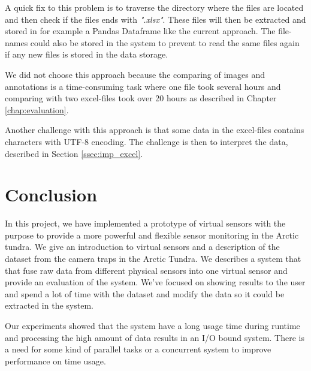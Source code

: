\documentclass[USenglish]{uit-thesis}
\begin{document}
A quick fix to this problem is to traverse the directory where the files are located and then check if the files ends with \textit{".xlsx"}. These files will then be extracted and stored in for example a Pandas Dataframe like the current approach. The file-names could also be stored in the system to prevent to read the same files again if any new files is stored in the data storage.

We did not choose this approach because the comparing of images and annotations is a time-consuming task where one file took several hours and comparing with two excel-files took over 20 hours as described in Chapter \ref{chap:evaluation}. %

Another challenge with this approach is that some data in the excel-files contains characters with UTF-8 encoding. The challenge is then to interpret the data, described in Section \ref{ssec:imp_excel}.





\chapter{Conclusion}
In this project, we have implemented a prototype of virtual sensors with the purpose to provide a more powerful and flexible sensor monitoring in the Arctic tundra. We give an introduction to virtual sensors and a description of the dataset from the camera traps in the Arctic Tundra. We describes a system that that fuse raw data from different physical sensors into one virtual sensor and provide an evaluation of the system.
We've focused on showing results to the user and spend a lot of time with the dataset and modify the data so it could be extracted in the system.

Our experiments showed that the system have a long usage time during runtime and processing the high amount of data results in an I/O bound system. There is a need for some kind of parallel tasks or a concurrent system to improve performance on time usage.
\end{document}
